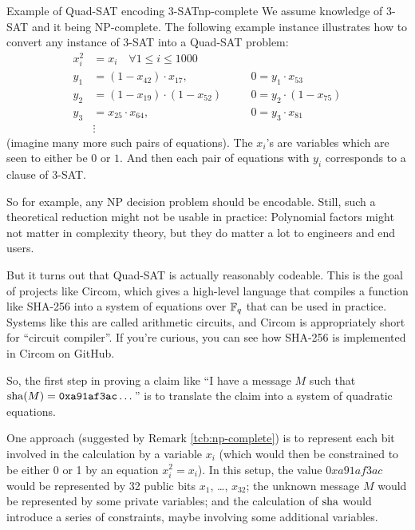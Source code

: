 \begin{remark}{Example of Quad-SAT encoding 3-SAT}{np-complete}
\label{np-complete}
We assume knowledge of 3-SAT and it
being NP-complete. The following example instance illustrates how to
convert any instance of 3-SAT into a Quad-SAT problem: \[\begin{aligned}
x_{i}^{2} & = x_{i}\quad\forall 1 \leq i \leq 1000 \\
y_{1} & = ( 1 - x_{42} ) \cdot x_{17}, & \quad & 0 = y_{1} \cdot x_{53} \\
y_{2} & = ( 1 - x_{19} ) \cdot ( 1 - x_{52} ) & \quad & 0 = y_{2} \cdot ( 1 - x_{75} ) \\
y_{3} & = x_{25} \cdot x_{64}, & \quad & 0 = y_{3} \cdot x_{81} \\
 & \vdots
\end{aligned}\] (imagine many more such pairs of equations). The
$x_i$'s are variables which are seen to either be $0$ or $1$.
And then each pair of equations with $y_{i}$ corresponds to a clause
of 3-SAT.
\end{remark}

So for example, any NP decision problem should be encodable. Still, such
a theoretical reduction might not be usable in practice: Polynomial
factors might not matter in complexity theory, but they do matter a lot
to engineers and end users.

But it turns out that Quad-SAT is actually reasonably codeable. This is
the goal of projects like Circom,
which gives a high-level language that compiles a function like SHA-256
into a system of equations over $\mathbb{F}_{q}$ that can be used in
practice. Systems like this are called \alert{arithmetic circuits}, and
Circom is appropriately short for ``circuit compiler''. If you're
curious, you can see how SHA-256 is implemented in Circom on
GitHub.

So, the first step in proving a claim like ``I have a message $M$ such
that $\operatorname{sha}(M) = \mathtt{0xa91af3ac}\dots$'' is to translate the
claim into a system of quadratic equations.

One approach (suggested by Remark \ref{tcb:np-complete}) is
to represent each bit involved in the calculation by a variable
$x_{i}$ (which would then be constrained to be either 0 or 1 by an
equation $x_{i}^{2} = x_{i}$). In this setup, the value $0xa91af3ac$
would be represented by 32 public bits $x_{1}$, \dots, $x_{32}$; the
unknown message $M$ would be represented by some private variables;
and the calculation of $\operatorname{sha}$ would introduce a series
of constraints, maybe involving some additional variables.

